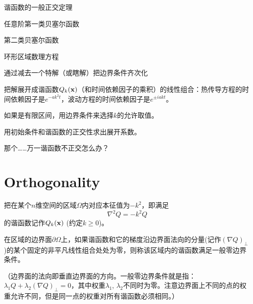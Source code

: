 \documentclass[CJK]{beamer}
\date{}
\begin{document}

\begin{frame}
\bch
\bitem
\item{谐函数的一般正交定理}
\item{任意阶第一类贝塞尔函数}
\item{第二类贝塞尔函数}
\item{环形区域数理方程}
\eitem
\ech
\end{frame}

\begin{frame}
  \bch
  \ech
\end{frame}

\begin{frame}
\bch
{}

\bitem
\item{通过减去一个特解（或瞎解）把边界条件齐次化}
\item{把解展开成谐函数$Q_k({\mathbf{x}})$（和时间依赖因子的乘积）的线性组合：热传导方程的时间依赖因子是$e^{-ak^2t}$，波动方程的时间依赖因子是$e^{\pm iakt}$。}
\item{如果是有限区间，用边界条件来选择$k$的允许取值。}
\item{用初始条件和谐函数的正交性求出展开系数。}
\eitem
\ech
\end{frame}



\begin{frame}
\bch

\bcenter
    {\large 那个……万一谐函数不正交怎么办？}

    \skiplines
    

\ecenter

\ech
\end{frame}


\section{Orthogonality}

\begin{frame}
\bch
把在某个$n$维空间的区域$\Omega$内对应本征值为$-k^2$，即满足
$$ \nabla^2 Q = - k^2 Q $$
的谐函数记作$Q_k({\mathbf{x}})$ (约定$k\ge 0$)。

\skipline

在区域的边界面$\partial \Omega$上，如果{谐函数和它的梯度沿边界面法向的分量(记作$(\nabla Q)_{\perp}$)的某个固定的非平凡线性组合处处为零}，则称该区域内的谐函数满足{\blue 一般零边界条件}。

\skiplines

{\small （边界面的法向即垂直边界面的方向。一般零边界条件就是指：$\lambda_1 Q + \lambda_2 (\nabla Q)_{\perp} = 0$，其中权重$\lambda_1$, $\lambda_2$不同时为零。注意边界面上不同的点的权重允许不同，但是同一点的权重对所有谐函数必须相同。）}


\ech
\end{frame}
\end{document}
